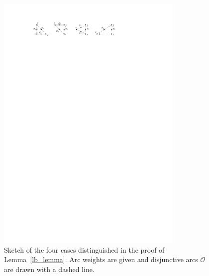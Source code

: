 \documentclass[a4paper]{article}
\theoremstyle{definition}
\theoremstyle{plain}
\newtheorem{proposition}{Proposition}
\begin{document}
\begin{figure}
  \centering
  \includegraphics[width=0.8\textwidth]{figures/single/lower-bound-lemma.pdf}
  \caption{Sketch of the four cases distinguished in the proof of
    Lemma~\ref{lb_lemma}. Arc weights are given and disjunctive arcs
    $\mathcal{O}$ are drawn with a dashed line.}\label{fig:lb_lemma}
\end{figure}


\end{document}
